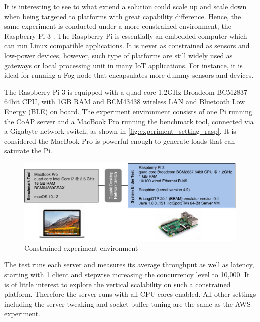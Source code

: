 It is interesting to see to what extend a solution could scale up and scale down when being targeted to platforms with great capability difference. Hence, the same experiment is conducted under a more constrained environment, the Raspberry Pi 3 \cite{raspberry_pi}. The Raspberry Pi is essentially an embedded computer which can run Linux compatible applications. It is never as constrained as sensors and low-power devices, however, such type of platforms are still widely used as gateways or local processing unit in many IoT applications. For instance, it is ideal for running a Fog node that encapsulates more dummy sensors and devices.

The Raspberry Pi 3 is equipped with a quad-core 1.2GHz Broadcom BCM2837 64bit CPU, with 1GB RAM and BCM43438 wireless LAN and Bluetooth Low Energy (BLE) on board. The experiment environment consists of one Pi running the CoAP server and a MacBook Pro running the benchmark tool, connected via a Gigabyte network switch, as shown in \autoref{fig:experiment_setting_rasp}. It is considered the MacBook Pro is powerful enough to generate loads that can saturate the Pi. 

\begin{figure}[!htbp]
\centering
\includegraphics[scale = 0.55]{experiment_setting_rasp}
\caption{Constrained experiment environment}
\label{fig:experiment_setting_rasp}
\end{figure}

The test runs each server and measures its average throughput as well as latency, starting with 1 client and stepwise increasing the concurrency level to 10,000. It is of little interest to explore the vertical scalability on such a constrained platform. Therefore the server runs with all CPU cores enabled. All other settings including the server tweaking and socket buffer tuning are the same as the AWS experiment.

